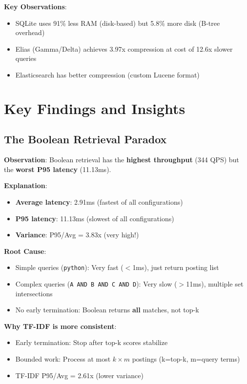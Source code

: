 \documentclass[12pt,a4paper]{article}
\begin{document}
\textbf{Key Observations}:
\begin{itemize}
    \item SQLite uses 91\% less RAM (disk-based) but 5.8\% more disk (B-tree overhead)
    \item Elias (Gamma/Delta) achieves 3.97x compression at cost of 12.6x slower queries
    \item Elasticsearch has better compression (custom Lucene format)
\end{itemize}

\section{Key Findings and Insights}

\subsection{The Boolean Retrieval Paradox}

\textbf{Observation}: Boolean retrieval has the \textbf{highest throughput} (344 QPS) but the \textbf{worst P95 latency} (11.13ms).

\textbf{Explanation}:
\begin{itemize}
    \item \textbf{Average latency}: 2.91ms (fastest of all configurations)
    \item \textbf{P95 latency}: 11.13ms (slowest of all configurations)
    \item \textbf{Variance}: P95/Avg = 3.83x (very high!)
\end{itemize}

\textbf{Root Cause}:
\begin{itemize}
    \item Simple queries (\texttt{python}): Very fast ($<$1ms), just return posting list
    \item Complex queries (\texttt{A AND B AND C AND D}): Very slow ($>$11ms), multiple set intersections
    \item No early termination: Boolean returns \textbf{all} matches, not top-k
\end{itemize}

\textbf{Why TF-IDF is more consistent}:
\begin{itemize}
    \item Early termination: Stop after top-k scores stabilize
    \item Bounded work: Process at most $k \times m$ postings (k=top-k, m=query terms)
    \item TF-IDF P95/Avg = 2.61x (lower variance)
\end{itemize}
\end{document}
